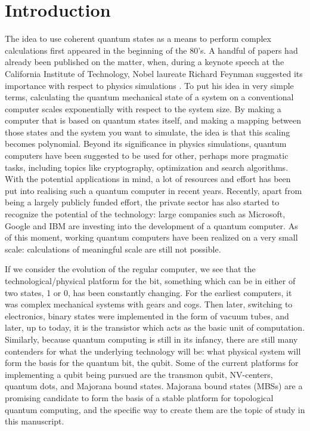 \chapter{Introduction}

	The idea to use coherent quantum states as a means to perform complex calculations first appeared in the beginning of the 80's.
	A handful of papers had already been published on the matter, when, during a keynote speech at the California Institute of Technology, Nobel laureate Richard Feynman suggested its importance with respect to physics simulations .
	To put his idea in very simple terms, calculating the quantum mechanical state of a system on a conventional computer scales exponentially with respect to the system size.
	By making a computer that is based on quantum states itself, and making a mapping between those states and the system you want to simulate, the idea is that this scaling becomes polynomial.
	Beyond its significance in physics simulations, quantum computers have been suggested to be used for other, perhaps more pragmatic tasks, including topics like cryptography, optimization and search algorithms.
	With the potential applications in mind, a lot of resources and effort has been put into realising such a quantum computer in recent years.
	Recently, apart from being a largely publicly funded effort, the private sector has also started to recognize the potential of the technology: large companies such as Microsoft, Google and IBM are investing into the development of a quantum computer.
	As of this moment, working quantum computers have been realized on a very small scale: calculations of meaningful scale are still not possible.

	If we consider the evolution of the regular computer, we see that the technological/physical platform for the bit, something which can be in either of two states, 1 or 0, has been constantly changing.
	For the earliest computers, it was complex mechanical systems with gears and cogs.
	Then later, switching to electronics, binary states were implemented in the form of vacuum tubes, and later, up to today, it is the transistor which acts as the basic unit of computation.
	Similarly, because quantum computing is still in its infancy, there are still many contenders for what the underlying technology will be: what physical system will form the basis for the quantum bit, the qubit.
	Some of the current platforms for implementing a qubit being pursued are the transmon qubit, NV-centers, quantum dots, and Majorana bound states.
	Majorana bound states (MBSs) are a promising candidate to form the basis of a stable platform for topological quantum computing, and the specific way to create them are the topic of study in this manuscript.

